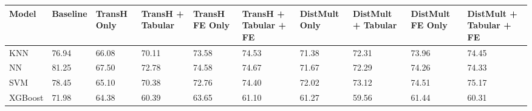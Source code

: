 \begin{tabular}{llllllllll}
\toprule
Model & Baseline & TransH Only & TransH + Tabular & TransH FE Only & TransH + Tabular + FE & DistMult Only & DistMult + Tabular & DistMult FE Only & DistMult + Tabular + FE \\
\midrule
KNN & 76.94 & 66.08 & 70.11 & 73.58 & 74.53 & 71.38 & 72.31 & 73.96 & 74.45 \\
NN & 81.25 & 67.50 & 72.78 & 74.58 & 74.67 & 71.67 & 72.29 & 74.26 & 74.33 \\
SVM & 78.45 & 65.10 & 70.38 & 72.76 & 74.40 & 72.02 & 73.12 & 74.51 & 75.17 \\
XGBoost & 71.98 & 64.38 & 60.39 & 63.65 & 61.10 & 61.27 & 59.56 & 61.44 & 60.31 \\
\bottomrule
\end{tabular}
